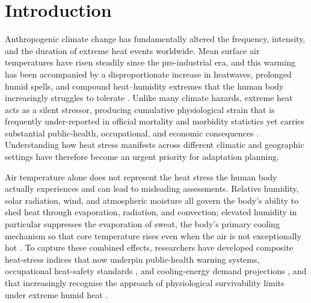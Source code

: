 \documentclass[pdflatex,sn-basic,lineno]{sn-jnl}
\begin{document}
\section{Introduction}\label{sec:intro}
Anthropogenic climate change has fundamentally altered the frequency, intensity,
and the duration of extreme heat events worldwide. Mean surface air temperatures have
risen steadily since the pre-industrial era, and this warming has been accompanied
by a disproportionate increase in heatwaves, prolonged humid spells, and compound
heat--humidity extremes that the human body increasingly struggles to tolerate
\citep{Shaw2022IPCCAsia}. Unlike many climate hazards, extreme heat acts as a
silent stressor, producing cumulative physiological strain that is frequently
under-reported in official mortality and morbidity statistics yet carries
substantial public-health, occupational, and economic consequences
\citep{Kjellstrom2019}. Understanding how heat stress manifests across different
climatic and geographic settings have therefore become an urgent priority for
adaptation planning.

Air temperature alone does not represent the heat stress the human body actually
experiences and can lead to misleading assessments. Relative humidity, solar
radiation, wind, and atmospheric moisture all govern the body's ability to shed
heat through evaporation, radiation, and convection; elevated humidity in
particular suppresses the evaporation of sweat, the body's primary cooling
mechanism so that core temperature rises even when the air is not exceptionally
hot \citep{steadman1979}. To capture these combined effects, researchers have
developed composite heat-stress indices that now underpin public-health warning
systems, occupational heat-safety standards \citep{iso7243_2017}, and cooling-energy
demand projections \citep{spinoni2018}, and that increasingly recognise the
approach of physiological survivability limits under extreme humid heat
\citep{raymond2020}.
\end{document}
